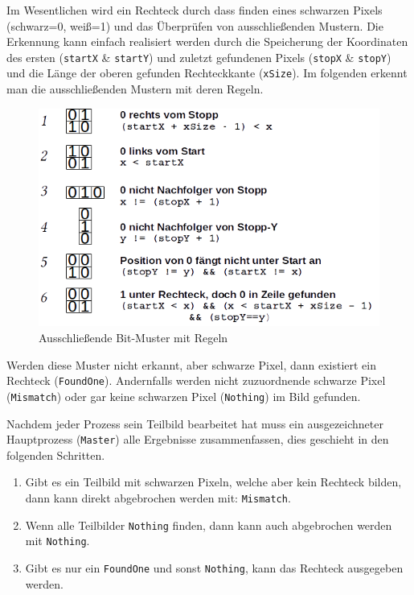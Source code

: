 Im Wesentlichen wird ein Rechteck durch dass finden eines schwarzen Pixels \linebreak(schwarz=0, weiß=1) und das Überprüfen von ausschließenden Mustern. Die Erkennung kann einfach realisiert werden durch die Speicherung der Koordinaten des ersten (\texttt{startX} \& \texttt{startY}) und zuletzt gefundenen Pixels (\texttt{stopX} \& \texttt{stopY}) und die Länge der oberen gefunden Rechteckkante (\texttt{xSize}). Im folgenden erkennt man die ausschließenden Mustern mit deren Regeln.
\begin{figure}[h]
    \centering
    \includegraphics[scale=0.75]{mismatches.png}
    \caption{Ausschließende Bit-Muster mit Regeln}
    \label{fig:mismatches}
\end{figure}

Werden diese Muster nicht erkannt, aber schwarze Pixel, dann existiert ein Rechteck (\texttt{FoundOne}). Andernfalls werden nicht zuzuordnende schwarze Pixel (\texttt{Mismatch}) oder gar keine schwarzen Pixel (\texttt{Nothing}) im Bild gefunden.

Nachdem jeder Prozess sein Teilbild bearbeitet hat muss ein ausgezeichneter Hauptprozess (\texttt{Master}) alle Ergebnisse zusammenfassen, dies geschieht in den folgenden Schritten.

\begin{enumerate}
	\item Gibt es ein Teilbild mit schwarzen Pixeln, welche aber kein Rechteck bilden, dann kann direkt abgebrochen werden mit: \texttt{Mismatch}.
	\item Wenn alle Teilbilder \texttt{Nothing} finden, dann kann auch abgebrochen werden mit \texttt{Nothing}.
	\item Gibt es nur ein \texttt{FoundOne} und sonst \texttt{Nothing}, kann das Rechteck ausgegeben werden.
\end{enumerate}

